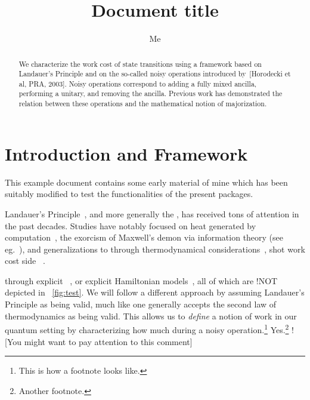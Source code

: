 \documentclass[10pt,a4paper,aps,reprint,notitlepage,nofootinbib]{revtex4-1}
\begin{document}
\title{Document title}
\author{Me}
\begin{abstract}
  We characterize the work cost of state transitions using a framework based on
  Landauer's Principle and on the so-called noisy operations introduced
  by~[Horodecki et al, PRA, 2003]. Noisy operations correspond to adding a fully
  mixed ancilla, performing a unitary, and removing the ancilla. Previous work
  has demonstrated the relation between these operations and the mathematical
  notion of majorization.
\end{abstract}
\maketitle

\section{Introduction and Framework}

This example document contains some early material of mine which has been
suitably modified to test the functionalities of the present packages.

Landauer's Principle~\cite{Landauer1961_5392446Erasure}, and more generally the
,
 \jd has received tons of attention \endjd in the
past decades.  Studies have notably focused on heat generated by
computation~\cite{Bennett1982IJTP_ThermodynOfComp}, the exorcism of Maxwell's
demon via information theory (see eg.~\cite{Bennett2003_NotesLP}), and
generalizations to  through thermodynamical
considerations~\cite{Oppenheim2002PRL_thermodynamical},  shot work cost    side
~\cite{delRio2011Nature}.

 through explicit ~\cite{Szilard1929ZeitschriftFuerPhysik,Dahlsten2011NJP_inadequacy}, or
explicit Hamiltonian models~\cite{Alicki2004_hamiltonian}, all of which are
\ccfour!{NOT}
depicted in \figurename~\ref{fig:test}. We will follow a different approach by
assuming Landauer's Principle as being valid, much like one generally accepts
the second law of thermodynamics as being valid. This allows us   to {\em define}
a notion of work in our quantum setting by characterizing how much
 during a noisy
operation.\footnote{This is how a footnote looks like.} Yes.\footnote{Another
  footnote.} \ccsix![You might want to pay attention to this comment]
\end{document}
